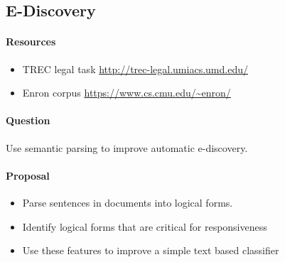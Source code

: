 \documentclass{article}
\begin{document}
\subsection{E-Discovery}

\paragraph{Resources}
\begin{itemize}
\item TREC legal task \url{http://trec-legal.umiacs.umd.edu/}
\item Enron corpus \url{https://www.cs.cmu.edu/~enron/}
\end{itemize}

\paragraph{Question} 
Use semantic parsing to improve automatic e-discovery. 

\paragraph{Proposal}
\begin{itemize}
\item Parse sentences in documents into logical forms. 
\item Identify logical forms that are critical for responsiveness
\item Use these features to improve a simple text based classifier 
\end{itemize}





\end{document}
